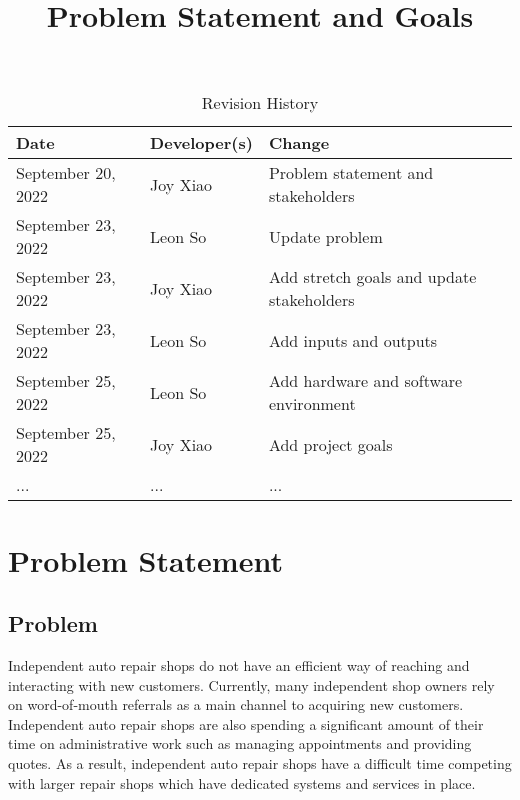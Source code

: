\documentclass{article}
\title{Problem Statement and Goals\\\progname}
\author{\authname}
\date{}
\begin{document}
\maketitle

\begin{table}[hp]
\caption{Revision History} \label{TblRevisionHistory}
\begin{tabularx}{\textwidth}{llX}
\toprule
\textbf{Date} & \textbf{Developer(s)} & \textbf{Change}\\
\midrule
September 20, 2022 & Joy Xiao & Problem statement and stakeholders\\
September 23, 2022 & Leon So & Update problem\\
September 23, 2022 & Joy Xiao & Add stretch goals and update stakeholders\\
September 23, 2022 & Leon So & Add inputs and outputs\\
September 25, 2022 & Leon So & Add hardware and software environment\\
September 25, 2022 & Joy Xiao & Add project goals\\
... & ... & ...\\
\bottomrule
\end{tabularx}
\end{table}

\section{Problem Statement}


\subsection{Problem}
Independent auto repair shops do not have an efficient way of reaching and interacting with new customers.
Currently, many independent shop owners rely on word-of-mouth referrals as a main channel to acquiring new customers. 
Independent auto repair shops are also spending a significant amount of their time on administrative work such as 
managing appointments and providing quotes. As a result, independent auto repair shops have a difficult time 
competing with larger repair shops which have dedicated systems and services in place.\\
\end{document}
